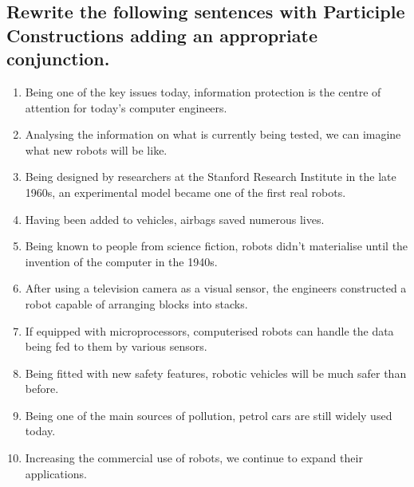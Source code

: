 \subsection*{Rewrite the following sentences with Participle Constructions adding an appropriate
      conjunction.}
\begin{enumerate}
      \item Being one of the key issues today, information protection is the centre of attention for today’s computer engineers.
      \item Analysing the information on what is currently being tested, we can imagine what new robots will be like.
      \item Being designed by researchers at the Stanford Research Institute in the late 1960s, an experimental model became one of the first real robots.
      \item Having been added to vehicles, airbags saved numerous lives.
      \item Being known to people from science fiction, robots didn’t materialise until the invention of the computer in the 1940s.
      \item After using a television camera as a visual sensor, the engineers constructed a robot capable of arranging blocks into stacks.
      \item If equipped with microprocessors, computerised robots can handle the data being fed to them by various sensors.
      \item Being fitted with new safety features, robotic vehicles will be much safer than before.
      \item Being one of the main sources of pollution, petrol cars are still widely used today.
      \item Increasing the commercial use of robots, we continue to expand their applications.
\end{enumerate}

